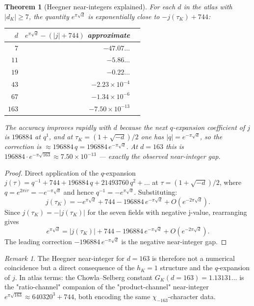\documentclass[11pt]{amsart}
\theoremstyle{plain}
\newtheorem{theorem}{Theorem}[section]
\theoremstyle{definition}
\theoremstyle{remark}
\newtheorem*{remark}{Remark}
\newcommand{\GK}{G_{K}}
\begin{document}
\begin{theorem}[Heegner near-integers explained]\label{thm:heegner}
For each $d$ in the atlas with $|d_K| \geq 7$, the quantity
$e^{\pi\sqrt{d}}$ is exponentially close to $-j(\tau_K) + 744$:
\begin{center}
\begin{tabular}{rrl}
\toprule
$d$ & $e^{\pi\sqrt{d}} - (|j| + 744)$ approximate \\
\midrule
$7$   & $-47.07\ldots$ \\
$11$  & $-5.86\ldots$ \\
$19$  & $-0.22\ldots$ \\
$43$  & $-2.23 \times 10^{-4}$ \\
$67$  & $-1.34 \times 10^{-6}$ \\
$163$ & $-7.50 \times 10^{-13}$ \\
\bottomrule
\end{tabular}
\end{center}
The accuracy improves rapidly with $d$ because the next $q$-expansion
coefficient of $j$ is $196884$ at $q^{1}$, and at $\tau_K = (1+\sqrt{-d})/2$
one has $|q| = e^{-\pi\sqrt{d}}$, so the correction is
$\approx 196884\, q = 196884\, e^{-\pi\sqrt{d}}$. At $d = 163$ this is
$196884 \cdot e^{-\pi\sqrt{163}} \approx 7.50 \times 10^{-13}$ --- exactly
the observed near-integer gap.
\end{theorem}

\begin{proof}
Direct application of the $q$-expansion
$j(\tau) = q^{-1} + 744 + 196884\, q + 21493760\, q^{2} + \ldots$ at
$\tau = (1 + \sqrt{-d})/2$, where $q = e^{2\pi i\tau} = -e^{-\pi\sqrt{d}}$
and hence $q^{-1} = -e^{\pi\sqrt{d}}$. Substituting:
\[
j(\tau_K) = -e^{\pi\sqrt{d}} + 744 - 196884\, e^{-\pi\sqrt{d}} + O(e^{-2\pi\sqrt{d}}).
\]
Since $j(\tau_K) = -|j(\tau_K)|$ for the seven fields with negative
j-value, rearranging gives
\[
e^{\pi\sqrt{d}} = |j(\tau_K)| + 744 - 196884\, e^{-\pi\sqrt{d}} + O(e^{-2\pi\sqrt{d}}).
\]
The leading correction $-196884\, e^{-\pi\sqrt{d}}$ is the negative
near-integer gap.
\end{proof}

\begin{remark}
The Heegner near-integer for $d = 163$ is therefore not a numerical
coincidence but a direct consequence of the $h_K = 1$ structure and the
$q$-expansion of $j$. In atlas terms: the Chowla--Selberg constant
$\GK(d = 163) = 1.13131\ldots$ is the "ratio-channel" companion of the
"product-channel" near-integer $e^{\pi\sqrt{163}} \approx 640320^{3} + 744$,
both encoding the same $\chi_{-163}$-character data.
\end{remark}
\end{document}
